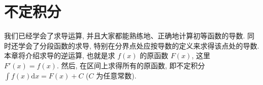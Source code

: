 
\chapter{不定积分}\label{ch:5}

我们已经学会了求导运算, 并且大家都能熟练地、正确地计算初等函数的导数. 同时还学会了分段函数的求导, 特别在分界点处应按导数的定义来求得该点处的导数. 本章将介绍求导的逆运算, 也就是求 $f(x)$ 的原函数 $F(x)$, 这里 $F'(x)=f(x)$. 然后, 在区间上求得所有的原函数, 即不定积分 $\int f(x)\mathrm{d}x=F(x)+C$ ($C$ 为任意常数).





